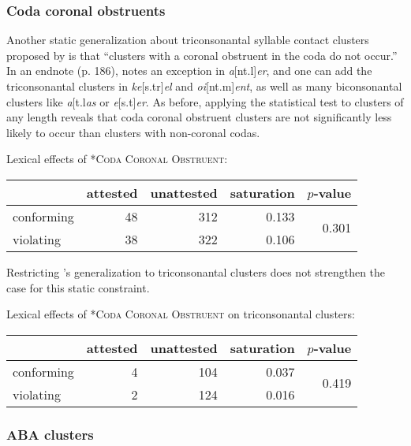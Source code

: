 \subsubsection{Coda coronal obstruents}

Another static generalization about triconsonantal syllable contact clusters proposed by \citet[][175]{Pierrehumbert1994} is that  ``clusters with a coronal obstruent in the coda do not occur.'' In an endnote (p. 186), \citet{Pierrehumbert1994} notes an exception in \emph{a}[nt.l]\emph{er}, and one can add the triconsonantal clusters in \emph{ke}[s.tr]\emph{el} and \emph{oi}[nt.m]\emph{ent}, as well as many biconsonantal clusters like \emph{a}[t.l\emph{as} or \emph{e}[s.t]\emph{er}. As before, applying the statistical test to clusters of any length reveals that coda coronal obstruent clusters are not significantly less likely to occur than clusters with non-coronal codas. 

\ex Lexical effects of \textsc{*Coda Coronal Obstruent}: \vspace{6pt} \\
\begin{tabular}{l r r r r}
\toprule
           & attested & unattested & saturation & $p$-value \\
\midrule
conforming &  48 & 312 & 0.133 & \multirow{2}{*}{0.301} \\
violating  &  38 & 322 & 0.106 \\
\bottomrule
\end{tabular}
\xe

Restricting \citeauthor{Pierrehumbert1994}'s generalization to triconsonantal clusters does not strengthen the case for this static constraint.

\ex Lexical effects of \textsc{*Coda Coronal Obstruent} on triconsonantal clusters: \vspace{6pt} \\
\begin{tabular}{l r r r r}
\toprule
           & attested & unattested & saturation & $p$-value \\
\midrule
conforming &  4 & 104 & 0.037 & \multirow{2}{*}{0.419} \\
violating  &  2 & 124 & 0.016 \\
\bottomrule
\end{tabular}
\xe



\subsubsection{ABA clusters}

